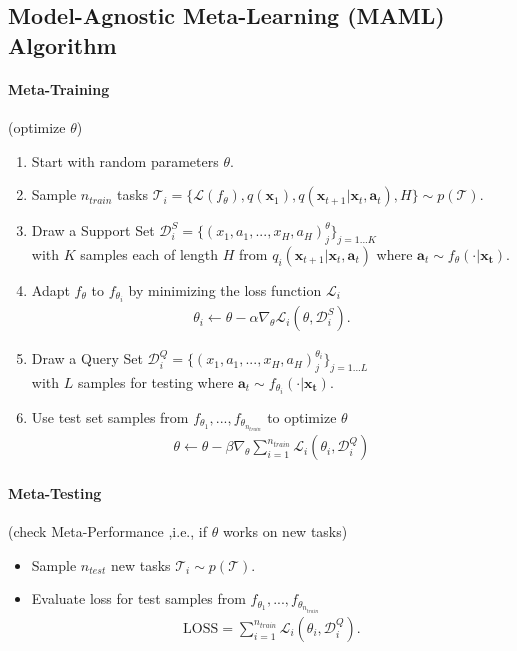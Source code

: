 \documentclass{article}
\begin{document}
\subsection{Model-Agnostic Meta-Learning (MAML) Algorithm}
\paragraph{Meta-Training} (optimize $\theta$) 
\begin{enumerate}
	\item Start with random parameters $\theta$.
	\item Sample $n_{train}$ tasks $\mathcal{T}_i = \{\mathcal{L}(f_{\theta}), q(\boldsymbol{x}_1), q(\boldsymbol{x}_{t+1} \vert \boldsymbol{x}_t, \boldsymbol{a}_t), H\} \sim p(\mathcal{T})$.
	\item Draw a Support Set $\mathcal{D}_i^{S}=\{(x_1, a_1, ..., x_H, a_H)_j^{\theta}\}_{j=1...K}$ \\
	with $K$ samples each of length $H$ from $q_i(\boldsymbol{x}_{t+1} \vert \boldsymbol{x}_t, \boldsymbol{a}_t)$ where $\boldsymbol{a}_t \sim f_{\theta}( \cdot \vert \boldsymbol{x_t})$.
	\item Adapt $f_{\theta}$ to $f_{\theta_i}$ by minimizing the loss function $\mathcal{L}_i$
	\begin{align}
		\theta_i \leftarrow \theta - \alpha \nabla_{\theta} \mathcal{L}_i(\theta, \mathcal{D}_i^{S}).
	\end{align}
	\item Draw a Query Set $\mathcal{D}_i^{Q}=\{(x_1, a_1, ..., x_H, a_H)_j^{\theta_i} \}_{j=1...L}$ \\ with $L$ samples for testing where $\boldsymbol{a}_t \sim f_{\theta_i}( \cdot \vert \boldsymbol{x_t})$.
	\item  Use test set samples from $f_{\theta_1}, ..., f_{\theta_{n_{train}}}$ to optimize $\theta$
	\begin{align}
		\theta \leftarrow \theta - \beta \nabla_{\theta} \sum_{i=1}^{n_{train}} \mathcal{L}_i(\theta_i, \mathcal{D}_{i}^{Q})
	\end{align}
\end{enumerate}
\paragraph{Meta-Testing} (check Meta-Performance ,i.e., if $\theta$ works on new tasks)
\begin{itemize}
	\item Sample $n_{test}$ new tasks $\mathcal{T}_i \sim p(\mathcal{T})$.
	\item Evaluate loss for test samples from $f_{\theta_1}, ..., f_{\theta_{n_{train}}}$
	\begin{align}
		\text{LOSS} = \sum_{i=1}^{n_{train}} \mathcal{L}_i(\theta_i, \mathcal{D}_{i}^{Q}).
	\end{align}
\end{itemize}
\end{document}
